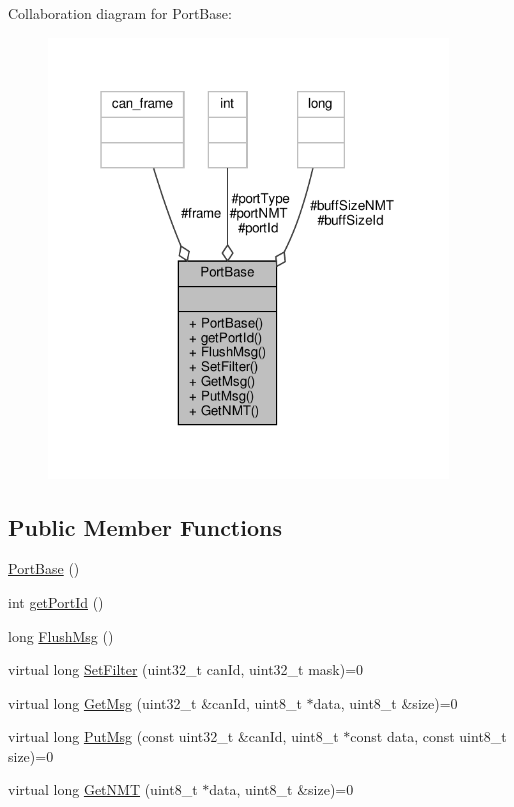 Collaboration diagram for Port\+Base\+:\nopagebreak
\begin{figure}[H]
\begin{center}
\leavevmode
\includegraphics[width=301pt]{classPortBase__coll__graph}
\end{center}
\end{figure}
\subsection*{Public Member Functions}
\begin{DoxyCompactItemize}
\item 
\hyperlink{classPortBase_acb7872550bc94538ef95d2510d763be3}{Port\+Base} ()
\item 
int \hyperlink{classPortBase_a45ec4a2cd5e17e098f6f72677437f066}{get\+Port\+Id} ()
\item 
long \hyperlink{classPortBase_a913932fc850e9aebc947542773c669ad}{Flush\+Msg} ()
\item 
virtual long \hyperlink{classPortBase_a1d857a81a8e3f3bd460ef7c802ee762c}{Set\+Filter} (uint32\+\_\+t can\+Id, uint32\+\_\+t mask)=0
\item 
virtual long \hyperlink{classPortBase_a4fe82768f2b79889d7084292ac0e8696}{Get\+Msg} (uint32\+\_\+t \&can\+Id, uint8\+\_\+t $\ast$data, uint8\+\_\+t \&size)=0
\item 
virtual long \hyperlink{classPortBase_a26213ebb6ea0a0b77f60c28944e3bb8e}{Put\+Msg} (const uint32\+\_\+t \&can\+Id, uint8\+\_\+t $\ast$const data, const uint8\+\_\+t size)=0
\item 
virtual long \hyperlink{classPortBase_abab2bf17b01d87c2bca01cb2151aa2f1}{Get\+N\+MT} (uint8\+\_\+t $\ast$data, uint8\+\_\+t \&size)=0
\end{DoxyCompactItemize}
